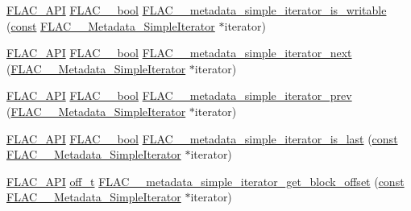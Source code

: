 \begin{DoxyCompactItemize}
\item 
\hyperlink{group__flac__export_ga56ca07df8a23310707732b1c0007d6f5}{F\+L\+A\+C\+\_\+\+A\+PI} \hyperlink{ordinals_8h_a95103469f1cbd78b8cf250194985b34e}{F\+L\+A\+C\+\_\+\+\_\+bool} \hyperlink{group__flac__metadata__level1_gadc654c1361b53737bab20efa3e75a0fc}{F\+L\+A\+C\+\_\+\+\_\+metadata\+\_\+simple\+\_\+iterator\+\_\+is\+\_\+writable} (\hyperlink{zconf_8h_a2c212835823e3c54a8ab6d95c652660e}{const} \hyperlink{group__flac__metadata__level1_ga6accccddbb867dfc2eece9ee3ffecb3a}{F\+L\+A\+C\+\_\+\+\_\+\+Metadata\+\_\+\+Simple\+Iterator} $\ast$iterator)
\item 
\hyperlink{group__flac__export_ga56ca07df8a23310707732b1c0007d6f5}{F\+L\+A\+C\+\_\+\+A\+PI} \hyperlink{ordinals_8h_a95103469f1cbd78b8cf250194985b34e}{F\+L\+A\+C\+\_\+\+\_\+bool} \hyperlink{group__flac__metadata__level1_gacac860d14fc0ff37cc2c034d3f972320}{F\+L\+A\+C\+\_\+\+\_\+metadata\+\_\+simple\+\_\+iterator\+\_\+next} (\hyperlink{group__flac__metadata__level1_ga6accccddbb867dfc2eece9ee3ffecb3a}{F\+L\+A\+C\+\_\+\+\_\+\+Metadata\+\_\+\+Simple\+Iterator} $\ast$iterator)
\item 
\hyperlink{group__flac__export_ga56ca07df8a23310707732b1c0007d6f5}{F\+L\+A\+C\+\_\+\+A\+PI} \hyperlink{ordinals_8h_a95103469f1cbd78b8cf250194985b34e}{F\+L\+A\+C\+\_\+\+\_\+bool} \hyperlink{group__flac__metadata__level1_ga49f495dec0f44116d66e1b79356a1160}{F\+L\+A\+C\+\_\+\+\_\+metadata\+\_\+simple\+\_\+iterator\+\_\+prev} (\hyperlink{group__flac__metadata__level1_ga6accccddbb867dfc2eece9ee3ffecb3a}{F\+L\+A\+C\+\_\+\+\_\+\+Metadata\+\_\+\+Simple\+Iterator} $\ast$iterator)
\item 
\hyperlink{group__flac__export_ga56ca07df8a23310707732b1c0007d6f5}{F\+L\+A\+C\+\_\+\+A\+PI} \hyperlink{ordinals_8h_a95103469f1cbd78b8cf250194985b34e}{F\+L\+A\+C\+\_\+\+\_\+bool} \hyperlink{group__flac__metadata__level1_ga4dd81539fb698163209d05af13a2ec3c}{F\+L\+A\+C\+\_\+\+\_\+metadata\+\_\+simple\+\_\+iterator\+\_\+is\+\_\+last} (\hyperlink{zconf_8h_a2c212835823e3c54a8ab6d95c652660e}{const} \hyperlink{group__flac__metadata__level1_ga6accccddbb867dfc2eece9ee3ffecb3a}{F\+L\+A\+C\+\_\+\+\_\+\+Metadata\+\_\+\+Simple\+Iterator} $\ast$iterator)
\item 
\hyperlink{group__flac__export_ga56ca07df8a23310707732b1c0007d6f5}{F\+L\+A\+C\+\_\+\+A\+PI} \hyperlink{fshook_8h_ab219cf84f750cf36312b756cb82d5e5e}{off\+\_\+t} \hyperlink{group__flac__metadata__level1_ga46e158a3f70c0e39db9c68a9ff9a2621}{F\+L\+A\+C\+\_\+\+\_\+metadata\+\_\+simple\+\_\+iterator\+\_\+get\+\_\+block\+\_\+offset} (\hyperlink{zconf_8h_a2c212835823e3c54a8ab6d95c652660e}{const} \hyperlink{group__flac__metadata__level1_ga6accccddbb867dfc2eece9ee3ffecb3a}{F\+L\+A\+C\+\_\+\+\_\+\+Metadata\+\_\+\+Simple\+Iterator} $\ast$iterator)

\end{DoxyCompactItemize}
